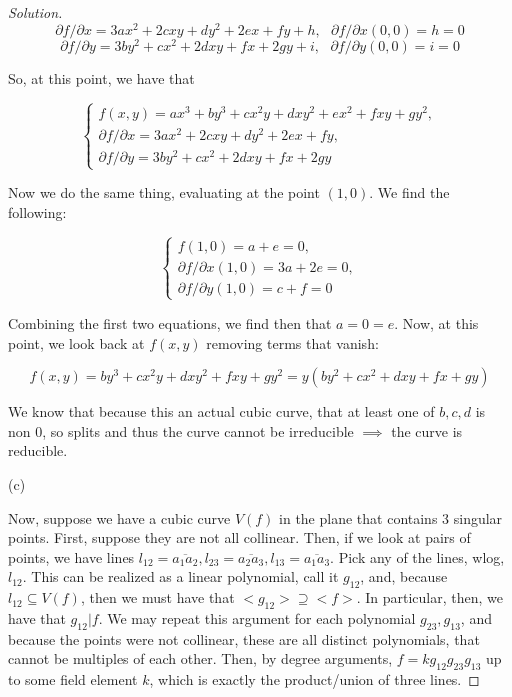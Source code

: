 \documentclass[10pt]{article}
\begin{document}
\begin{proof}[Solution]
$$ \partial f/\partial x = 3ax^2 + 2cxy + dy^2 + 2ex + fy + h,\text{  } \partial f/\partial x(0,0) = h = 0 $$
$$ \partial f/ \partial y = 3by^2 + cx^2 + 2dxy + fx + 2gy + i, \text{  } \partial f /\partial y (0,0) = i = 0 $$

So, at this point, we have that

$$ \begin{cases} f(x,y) = ax^3 + by^3 + cx^2y + dxy^2 + ex^2 + fxy + gy^2,\\ \partial f/\partial x = 3ax^2 + 2cxy + dy^2 + 2ex + fy,\\  \partial f/ \partial y = 3by^2 + cx^2 + 2dxy + fx + 2gy \end{cases}$$

Now we do the same thing, evaluating at the point $(1,0)$. We find the following:

$$ \begin{cases} f(1,0) = a +  e  = 0,\\ \partial f/\partial x(1,0) = 3a +  2e = 0,\\  \partial f/ \partial y(1,0) = c + f = 0\end{cases}$$

Combining the first two equations, we find then that $a = 0 = e$. Now, at this point, we look back at $f(x,y)$ removing terms that vanish:

$$ f(x,y) = by^3 + cx^2y  + dxy^2 + fxy + gy^2 = y(by^2 + cx^2 + dxy + fx + gy) $$

We know that because this an actual cubic curve, that at least one of $b,c, d$ is non 0, so splits and thus the curve cannot be irreducible $\implies$ the curve is reducible.

(c)

Now, suppose we have a cubic curve $V(f)$ in the plane that contains 3 singular points. First, suppose they are not all collinear. Then, if we look at pairs of points, we have lines $l_{12} = \overline{a_1a_2}, l_{23} = \overline{a_2a_3}, l_{13} = \overline{a_1a_3}$. Pick any of the lines, wlog, $l_{12}$. This can be realized as a linear polynomial, call it $g_{12}$, and, because $l_{12} \subseteq V(f)$, then we must have that $<g_{12}> \supseteq <f>$. In particular, then, we have that $g_{12} | f$. We may repeat this argument for each polynomial $g_{23}, g_{13}$, and because the points were not collinear, these are all distinct polynomials, that cannot be multiples of each other. Then, by degree arguments, $f = kg_{12}g_{23}g_{13}$ up to some field element $k$, which is exactly the product/union of three lines.


\end{proof}
\end{document}
